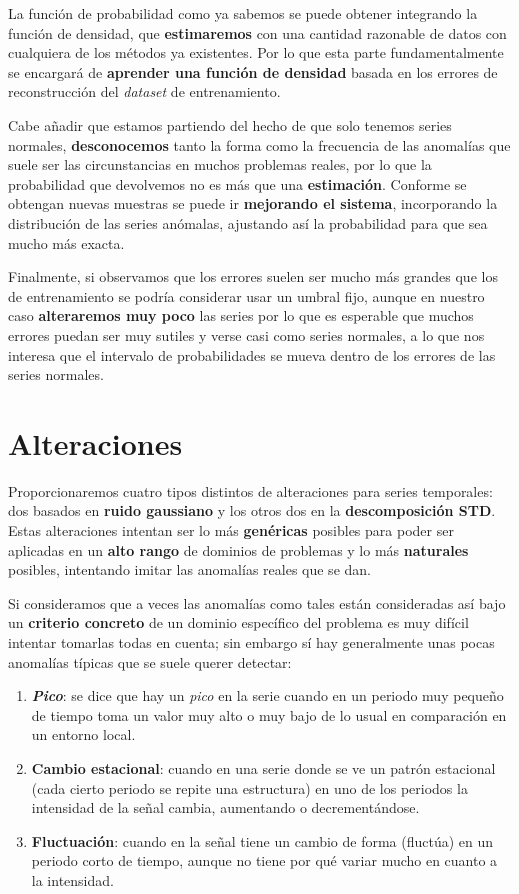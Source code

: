 La función de probabilidad como ya sabemos se puede obtener integrando la función de densidad, que \textbf{estimaremos} con una cantidad razonable de datos con cualquiera de los métodos ya existentes. Por lo que esta parte fundamentalmente se encargará de \textbf{aprender una función de densidad} basada en los errores de reconstrucción del \emph{dataset} de entrenamiento.

Cabe añadir que estamos partiendo del hecho de que solo tenemos series normales, \textbf{desconocemos} tanto la forma como la frecuencia de las anomalías que suele ser las circunstancias en muchos problemas reales, por lo que la probabilidad que devolvemos no es más que una \textbf{estimación}. Conforme se obtengan nuevas muestras se puede ir \textbf{mejorando el sistema}, incorporando la distribución de las series anómalas, ajustando así la probabilidad para que sea mucho más exacta.

Finalmente, si observamos que los errores suelen ser mucho más grandes que los de entrenamiento se podría considerar usar un umbral fijo, aunque en nuestro caso \textbf{alteraremos muy poco} las series por lo que es esperable que muchos errores puedan ser muy sutiles y verse casi como series normales, a lo que nos interesa que el intervalo de probabilidades se mueva dentro de los errores de las series normales.

\chapter{Alteraciones}\label{ch:ad-alteraciones}

Proporcionaremos cuatro tipos distintos de alteraciones para series temporales: dos basados en \textbf{ruido gaussiano} y los otros dos en la \textbf{descomposición STD}. Estas alteraciones intentan ser lo más \textbf{genéricas} posibles para poder ser aplicadas en un \textbf{alto rango} de dominios de problemas y lo más \textbf{naturales} posibles, intentando imitar las anomalías reales que se dan.

Si consideramos que a veces las anomalías como tales están consideradas así bajo un \textbf{criterio concreto} de un dominio específico del problema es muy difícil intentar tomarlas todas en cuenta; sin embargo sí hay generalmente unas pocas anomalías típicas que se suele querer detectar:

\begin{enumerate}
  \item \textbf{\emph{Pico}}: se dice que hay un \emph{pico} en la serie cuando en un periodo muy pequeño de tiempo toma un valor muy alto o muy bajo de lo usual en comparación en un entorno local.
  \item \textbf{Cambio estacional}: cuando en una serie donde se ve un patrón estacional (cada cierto periodo se repite una estructura) en uno de los periodos la intensidad de la señal cambia, aumentando o decrementándose.
  \item \textbf{Fluctuación}: cuando en la señal tiene un cambio de forma (fluctúa) en un periodo corto de tiempo, aunque no tiene por qué variar mucho en cuanto a la intensidad.
\end{enumerate}

